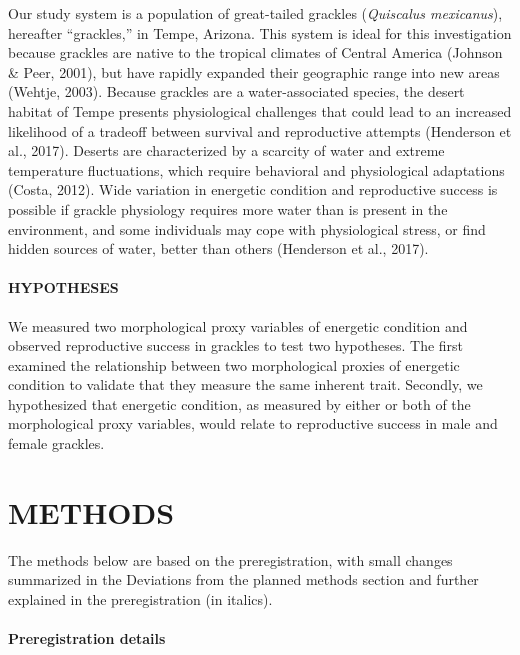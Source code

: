 \documentclass[
]{article}
\begin{document}
Our study system is a population of great-tailed grackles
(\emph{Quiscalus mexicanus}), hereafter ``grackles,'' in Tempe, Arizona.
This system is ideal for this investigation because grackles are native
to the tropical climates of Central America (Johnson \& Peer, 2001), but
have rapidly expanded their geographic range into new areas (Wehtje,
2003). Because grackles are a water-associated species, the desert
habitat of Tempe presents physiological challenges that could lead to an
increased likelihood of a tradeoff between survival and reproductive
attempts (Henderson et al., 2017). Deserts are characterized by a
scarcity of water and extreme temperature fluctuations, which require
behavioral and physiological adaptations (Costa, 2012). Wide variation
in energetic condition and reproductive success is possible if grackle
physiology requires more water than is present in the environment, and
some individuals may cope with physiological stress, or find hidden
sources of water, better than others (Henderson et al., 2017).

\hypertarget{hypotheses}{%
\paragraph{HYPOTHESES}\label{hypotheses}}

We measured two morphological proxy variables of energetic condition and
observed reproductive success in grackles to test two hypotheses. The
first examined the relationship between two morphological proxies of
energetic condition to validate that they measure the same inherent
trait. Secondly, we hypothesized that energetic condition, as measured
by either or both of the morphological proxy variables, would relate to
reproductive success in male and female grackles.

\pagebreak

\hypertarget{methods}{%
\section{METHODS}\label{methods}}

The methods below are based on the preregistration, with small changes
summarized in the Deviations from the planned methods section and
further explained in the preregistration (in italics).

\hypertarget{preregistration-details}{%
\paragraph{\texorpdfstring{\textbf{Preregistration
details}}{Preregistration details}}\label{preregistration-details}}
\end{document}
